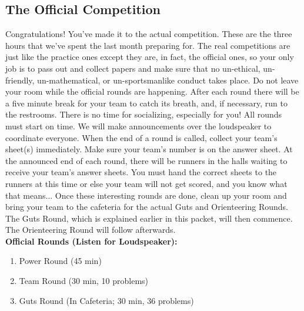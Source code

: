 \documentclass[11pt]{article}
\begin{document}
\begin{small}
\section{The Official Competition}
\noindent Congratulations! You've made it to the actual competition. These are the three hours that we've
spent the last month preparing for. The real competitions are just like the practice ones except they are, in fact, the official ones, so your only job is to pass out and collect papers and make sure that no un-ethical, un-friendly, un-mathematical, or un-sportsmanlike conduct takes place. Do not leave your room while the official rounds are happening. After each round there will be a five minute break for your team to catch its breath, and, if necessary, run to the restrooms. There is no time for socializing, especially for you!  All rounds must start on time. We will make announcements over the loudspeaker to coordinate everyone. When the end of a round is called, collect your team's sheet(s) immediately. Make sure your team's number is on the answer sheet. At the announced end of each round, there will be runners in the halls waiting to receive your team's answer sheets. You must hand the correct sheets to the runners at this time or else your team will not get scored, and you know what that means... Once these interesting rounds are done, clean up your room and bring your team to the cafeteria for the actual Guts and Orienteering Rounds. The Guts Round, which is explained earlier in this packet, will then commence. The Orienteering Round will follow afterwards. \\

\noindent \textbf{Official Rounds (Listen for Loudspeaker): }
\begin{enumerate}
  \item Power Round (45 min)
  \item Team Round (30 min, 10 problems)
  \item Guts Round (In Cafeteria; 30 min, 36 problems)
\end{enumerate}


\end{small}
\end{document}
